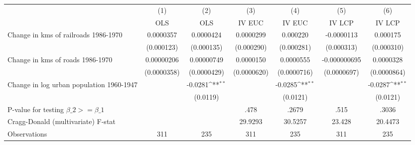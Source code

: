 {
\def\sym#1{\ifmmode^{#1}\else\(^{#1}\)\fi}
\begin{tabular}{l*{6}{c}}
\hline\hline
                &\multicolumn{1}{c}{(1)}&\multicolumn{1}{c}{(2)}&\multicolumn{1}{c}{(3)}&\multicolumn{1}{c}{(4)}&\multicolumn{1}{c}{(5)}&\multicolumn{1}{c}{(6)}\\
                &\multicolumn{1}{c}{OLS}&\multicolumn{1}{c}{OLS}&\multicolumn{1}{c}{IV EUC}&\multicolumn{1}{c}{IV EUC}&\multicolumn{1}{c}{IV LCP}&\multicolumn{1}{c}{IV LCP}\\
\hline
Change in kms of railroads 1986-1970&0.0000357         &0.0000424         &0.0000299         & 0.000220         &-0.0000113         & 0.000175         \\
                &(0.000123)         &(0.000135)         &(0.000290)         &(0.000281)         &(0.000313)         &(0.000310)         \\
[1em]
Change in kms of roads 1986-1970&0.00000206         &0.00000749         &0.0000150         &0.0000555         &-0.000000695         &0.0000328         \\
                &(0.0000358)         &(0.0000429)         &(0.0000620)         &(0.0000716)         &(0.0000697)         &(0.0000864)         \\
[1em]
Change in log urban population 1960-1947&                  &  -0.0281\sym{**} &                  &  -0.0285\sym{**} &                  &  -0.0287\sym{**} \\
                &                  & (0.0119)         &                  & (0.0121)         &                  & (0.0121)         \\
\hline
P-value for testing $\beta\_{2} >= \beta\_{1}$&                  &                  &     .478         &    .2679         &     .515         &    .3036         \\
Cragg-Donald (multivariate) F-stat&                  &                  &  29.9293         &  30.5257         &   23.428         &  20.4473         \\
Observations    &      311         &      235         &      311         &      235         &      311         &      235         \\
\hline\hline
\end{tabular}
}
